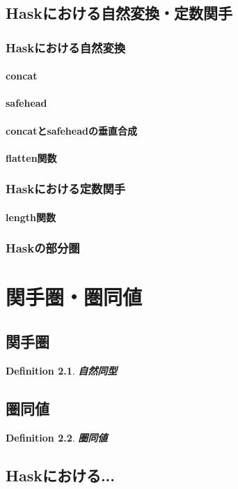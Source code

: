 \documentclass{jsbook}
\theoremstyle{plain}
\newtheorem{Def}{Definition}[chapter]
\begin{document}
\section{Haskにおける自然変換・定数関手}
\subsection{Haskにおける自然変換}
\subsubsection{concat}
\subsubsection{safehead}
\subsubsection{concatとsafeheadの垂直合成}
\subsubsection{flatten関数}
\subsection{Haskにおける定数関手}
\subsubsection{length関数}
\subsection{Haskの部分圏}
\chapter{関手圏・圏同値}
\section{関手圏}
\begin{Def}
\bf{自然同型}
\end{Def}
\section{圏同値}
\begin{Def}
\bf{圏同値}
\end{Def}
\section{Haskにおける...}
\end{document}
